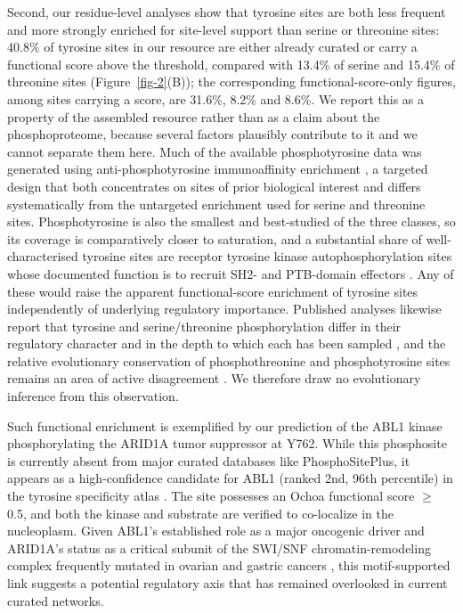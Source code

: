\documentclass[
  number,
  preprint,
  onecolumn]{elsarticle}
\begin{document}
Second, our residue-level analyses show that tyrosine sites are both
less frequent and more strongly enriched for site-level support than
serine or threonine sites: 40.8\% of tyrosine sites in our resource are
either already curated or carry a functional score above the threshold,
compared with 13.4\% of serine and 15.4\% of threonine sites
(Figure~\ref{fig-2}(B)); the corresponding functional-score-only
figures, among sites carrying a score, are 31.6\%, 8.2\% and 8.6\%. We
report this as a property of the assembled resource rather than as a
claim about the phosphoproteome, because several factors plausibly
contribute to it and we cannot separate them here. Much of the available
phosphotyrosine data was generated using anti-phosphotyrosine
immunoaffinity enrichment \citep{Rush2005-py}, a targeted design that
both concentrates on sites of prior biological interest and differs
systematically from the untargeted enrichment used for serine and
threonine sites. Phosphotyrosine is also the smallest and best-studied
of the three classes, so its coverage is comparatively closer to
saturation, and a substantial share of well-characterised tyrosine sites
are receptor tyrosine kinase autophosphorylation sites whose documented
function is to recruit SH2- and PTB-domain effectors
\citep{Miller2018-hi}. Any of these would raise the apparent
functional-score enrichment of tyrosine sites independently of
underlying regulatory importance. Published analyses likewise report
that tyrosine and serine/threonine phosphorylation differ in their
regulatory character and in the depth to which each has been sampled
\citep{Sharma2014-ud, Ochoa2020-og}, and the relative evolutionary
conservation of phosphothreonine and phosphotyrosine sites remains an
area of active disagreement \citep{Landry2009-wf, Ochoa2020-og}. We
therefore draw no evolutionary inference from this observation.

Such functional enrichment is exemplified by our prediction of the ABL1
kinase phosphorylating the ARID1A tumor suppressor at Y762. While this
phosphosite is currently absent from major curated databases like
PhosphoSitePlus, it appears as a high-confidence candidate for ABL1
(ranked 2nd, 96th percentile) in the tyrosine specificity atlas
\citep{Yaron-Barir2024-lv}. The site possesses an Ochoa functional score
\(\ge\) 0.5, and both the kinase and substrate are verified to
co-localize in the nucleoplasm. Given ABL1's established role as a major
oncogenic driver \citep{Druker2001-fn} and ARID1A's status as a critical
subunit of the SWI/SNF chromatin-remodeling complex frequently mutated
in ovarian and gastric cancers \citep{Wiegand2010-di, Wang2011-vb}, this
motif-supported link suggests a potential regulatory axis that has
remained overlooked in current curated networks.
\end{document}
